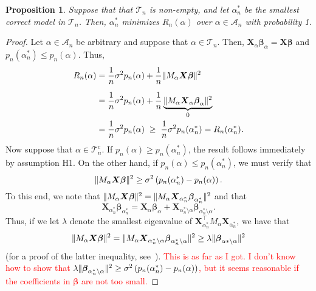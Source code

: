\documentclass[12pt, letter paper]{article}
\newcommand{\1}{\mathmybb{1}}
\newtheorem{proposition}{Proposition}[section]
\newcommand{\0}{\emptyset}
\newcommand{\paren}[1]{\left(#1 \right)}
\newcommand{\norm}[1]{|\hspace{-1pt}|#1 |\hspace{-1pt}|}
\newcommand{\normsq}[1]{\norm{#1}^{2}}
\newcommand{\Acal}{\mathcal{A}_{n}}
\newcommand{\Tcal}{\mathcal{T}_{n}}
\newcommand{\X}{\boldsymbol{X}}
\newcommand{\bbeta}{\boldsymbol{\beta}}
\begin{document}
\begin{proposition}\label{prop:Ropt}
    Suppose that that \(\Tcal\) is non-empty, and let \(\alpha^{*}_{n}\) be the smallest correct model in \(\Tcal\). Then, \(\alpha^{*}_{n}\) minimizes \(R_{n}(\alpha)\) over \(\alpha\in\Acal\) with probability 1.
\end{proposition}

\begin{proof}
    Let \(\alpha\in\Acal\) be arbitrary and suppose that \(\alpha\in\Tcal\). Then, \(\X_{\alpha}\bbeta_{\alpha} = \X\bbeta\) and \(p_{n}(\alpha_{n}^{*})\leq p_{n}(\alpha)\). Thus,
    \begin{align*}
        R_{n}(\alpha) &= \frac{1}{n}\sigma^{2}p_{n}(\alpha) + \frac{1}{n}\normsq{M_{\alpha}\X\bbeta}\\[2mm]
        &= \frac{1}{n} \sigma^{2}p_{n}(\alpha) + \frac{1}{n}\underbrace{\normsq{M_{\alpha}\X_{\alpha}\bbeta_{\alpha}}}_{0}\\
        &= \frac{1}{n}\sigma^{2}p_{n}(\alpha)\; \geq \; \frac{1}{n}\sigma^{2}p_{n}(\alpha_{n}^{*}) = R_{n}(\alpha_{n}^{*}).
    \end{align*}
    Now suppose that \(\alpha\in\Tcal^{c}\). If \(p_{n}(\alpha)\geq p_{n}(\alpha_{n}^{*})\), the result follows immediately by assumption H1. On the other hand, if \(p_{n}(\alpha)\leq p_{n}(\alpha_{n}^{*})\), we must verify that
    \begin{equation}\label{eq:Roptgoal}
        \normsq{M_{\alpha}\X\bbeta} \geq \sigma^{2}\paren{p_{n}(\alpha_{n}^{*}) - p_{n}(\alpha)}.
    \end{equation}
    To this end, we note that \(\normsq{M_{\alpha}\X\bbeta} = \normsq{M_{\alpha}\X_{\alpha_{n}^{*}}\bbeta_{\alpha_{n}^{*}}}\) and that 
    \[\X_{\alpha_{n}^{*}}\bbeta_{\alpha_{n}^{*}} = \X_{\alpha}\bbeta_{\alpha} + \X_{\alpha_{n}^{*}\setminus\alpha}\bbeta_{\alpha_{n}^{*}\setminus\alpha} .\]
    Thus, if we let \(\lambda\) denote the smallest eigenvalue of \(\X_{\alpha_{n}^{*}}^{\top}M_{\alpha}\X_{\alpha_{n}^{*}}\), we have that
    \[\normsq{M_{\alpha}\X\bbeta} = \normsq{M_{\alpha}\X_{\alpha_{n}^{*}\setminus\alpha}\bbeta_{\alpha_{n}^{*}\setminus\alpha}} \geq \lambda\normsq{\bbeta_{\alpha*\setminus\alpha}}\]
    (for a proof of the latter inequality, see~\textcite{hansen_2022}).
    \textcolor{red}{This is as far as I got. I don't know how to show that \(\lambda\normsq{\bbeta_{\alpha_{n}^{*}\setminus\alpha}}\geq \sigma^{2}\paren{p_{n}(\alpha_{n}^{*}) - p_{n}(\alpha)}\), but it seems reasonable if the coefficients in \(\bbeta\) are not too small.}
\end{proof}
\end{document}
